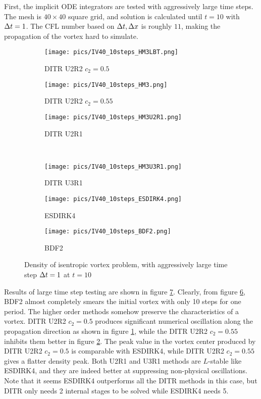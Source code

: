 \documentclass[preprint,12pt]{elsarticle}
\begin{document}
First, the implicit ODE integrators are tested with aggressively large
time steps.
The mesh is $40\times40$ square grid,
and solution is calculated until $t=10$ with $\mathrm\Delta t=1$.
The CFL number based on $\mathrm\Delta t, \mathrm\Delta x$ is roughly $11$,
making the propagation of the vortex hard to
simulate.

\begin{figure}[htbp]
    \centering
    \begin{subfigure}{0.33\textwidth}
        \texttt{[image: pics/IV40\_10steps\_HM3LBT.png]}
        \caption[]{DITR U2R2 $c_2=0.5$}
        \label{sfig:IV10Step_HM3LBT}
    \end{subfigure}\hfill
    \begin{subfigure}{0.33\textwidth}
        \texttt{[image: pics/IV40\_10steps\_HM3.png]}
        \caption[]{DITR U2R2 $c_2=0.55$}
        \label{sfig:IV10Step_HM3}
    \end{subfigure}\hfill
    \begin{subfigure}{0.33\textwidth}
        \texttt{[image: pics/IV40\_10steps\_HM3U2R1.png]}
        \caption[]{DITR U2R1}
        \label{sfig:IV40_10steps_HM3U2R1}
    \end{subfigure}\\
    \begin{subfigure}{0.33\textwidth}
        \texttt{[image: pics/IV40\_10steps\_HM3U3R1.png]}
        \caption[]{DITR U3R1}
        \label{sfig:IV40_10steps_HM3U3R1}
    \end{subfigure}\hfill
    \begin{subfigure}{0.33\textwidth}
        \texttt{[image: pics/IV40\_10steps\_ESDIRK4.png]}
        \caption[]{ESDIRK4}
        \label{sfig:IV10Step_ESDIRK4}
    \end{subfigure}\hfill
    \begin{subfigure}{0.33\textwidth}
        \texttt{[image: pics/IV40\_10steps\_BDF2.png]}
        \caption[]{BDF2}
        \label{sfig:IV10Step_BDF2}
    \end{subfigure}
    \caption{Density of isentropic vortex problem, with aggressively large time step $\mathrm\Delta t = 1$ at $t=10$}
    \label{fig:IV10Step}
\end{figure}

Results of large time step testing are shown in figure \ref{fig:IV10Step}.
Clearly, from figure \ref{sfig:IV10Step_BDF2}, BDF2 almost completely
smears the initial vortex with only 10 steps for one period.
The higher order methods somehow preserve the characteristics of
a vortex. DITR U2R2 $c_2=0.5$ produces significant numerical oscillation along
the propagation direction as shown in figure \ref{sfig:IV10Step_HM3LBT},
while the DITR U2R2 $c_2=0.55$ inhibits them better in figure \ref{sfig:IV10Step_HM3}.
The peak value in the vortex center produced by DITR U2R2 $c_2=0.5$ is comparable with
ESDIRK4, while DITR U2R2 $c_2=0.55$ gives a flatter density peak.
Both U2R1 and U3R1 methods are $L$-stable like ESDIRK4, and they
are indeed better at suppressing non-physical oscillations.
Note that it seems ESDIRK4 outperforms all the DITR methods in
this case, but DITR only needs 2 internal stages to be solved while
ESDIRK4 needs 5.
\end{document}
